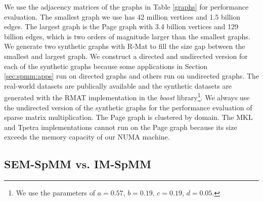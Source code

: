 We use the adjacency matrices of the graphs in Table \ref{graphs} for performance
evaluation. The smallest graph we use has 42 million vertices and 1.5 billion
edges. The largest graph is the Page graph with 3.4 billion vertices
and 129 billion edges, which is two orders of magnitude larger than the smallest
graphs. We generate two synthetic graphs with R-Mat \cite{rmat} to fill the size
gap between the smallest and largest graph. We construct a directed and
undirected version for each of the synthetic graphs because some applications
in Section \ref{sec:spmm:apps} run on directed graphs and others run on undirected
graphs. The real-world datasets are publically available and the synthetic
datasets are generated with the RMAT implementation in the \textit{boost}
library\footnote{We use the parameters of $a=0.57$, $b=0.19$, $c=0.19$,
$d=0.05$.}. We always use the undirected version of the synthetic graphs for
the performance evaluation of sparse matrix multiplication. The Page graph is
clustered by domain. The MKL and Tpetra implementations cannot run on the Page
graph because its size exceeds the memory capacity of our NUMA machine.

\subsection{SEM-SpMM vs. IM-SpMM}

